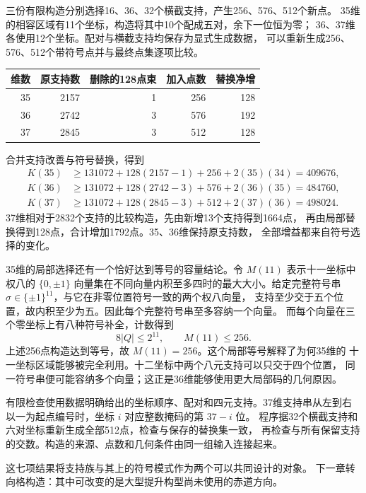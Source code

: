 三份有限构造分别选择16、36、32个横截支持，产生256、576、512个新点。
35维的相容区域有11个坐标，构造将其中10个配成五对，余下一位恒为零；
36、37维各使用12个坐标。配对与横截支持均保存为显式生成数据，
可以重新生成256、576、512个带符号点并与最终点集逐项比较。
\begin{center}
\begin{minipage}{\linewidth}\centering
{}
\label{tab:signed-replacements}
\begin{tabular}{rrrrr}
\toprule
维数 & 原支持数 & 删除的128点束 & 加入点数 & 替换净增\\
\midrule
35&2157&1&256&128\\
36&2742&3&576&192\\
37&2845&3&512&128\\
\bottomrule
\end{tabular}
\end{minipage}
\end{center}
合并支持改善与符号替换，得到
\begin{align*}
K(35)&\ge131072+128(2157-1)+256+2(35)(34)=409676,\\
K(36)&\ge131072+128(2742-3)+576+2(36)(35)=484760,\\
K(37)&\ge131072+128(2845-3)+512+2(37)(36)=498024.
\end{align*}
37维相对于2832个支持的比较构造，先由新增13个支持得到1664点，
再由局部替换得到128点，合计增加1792点。35、36维保持原支持数，
全部增益都来自符号选择的变化。

35维的局部选择还有一个恰好达到等号的容量结论。令 $M(11)$ 表示十一坐标中
权八的 $\{0,\pm1\}$ 向量集在不同向量内积至多四时的最大大小。给定完整符号串
$\sigma\in\{\pm1\}^{11}$，与它在非零位置符号一致的两个权八向量，
支持至少交于五个位置，故内积至少为五。因此每个完整符号串至多容纳一个向量。
而每个向量在三个零坐标上有八种符号补全，计数得到
\[
8|Q|\le2^{11},\qquad M(11)\le256.
\]
上述256点构造达到等号，故 $M(11)=256$。这个局部等号解释了为何35维的
十一坐标区域能够被完全利用。十二坐标中两个八元支持可以只交于四个位置，
同一符号串便可能容纳多个向量；这正是36维能够使用更大局部码的几何原因。

有限检查使用数据明确给出的坐标顺序、配对和四元支持。37维支持串从左到右
以一为起点编号时，坐标 $i$ 对应整数掩码的第 $37-i$ 位。
程序据32个横截支持和六对坐标重新生成全部512点，检查与保存的替换集一致，
再检查与所有保留支持的交数。构造的来源、点数和几何条件由同一组输入连接起来。

这七项结果将支持族与其上的符号模式作为两个可以共同设计的对象。
下一章转向格构造：其中可改变的是大型提升构型尚未使用的赤道方向。
